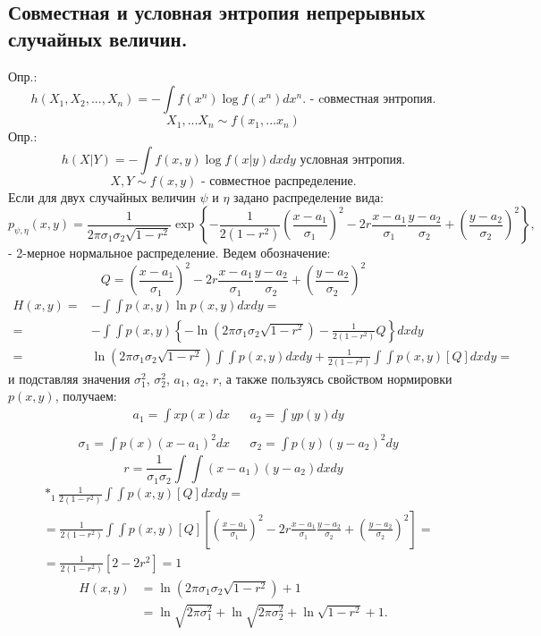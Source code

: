 \documentclass[12pt,a4paper]{scrartcl}
\begin{document}
	\subsection{Совместная и условная энтропия непрерывных случайных величин.}
	Опр.: \\
	\begin{equation}
	h(X_1, X_2,..., X_n) = -\int f(x^n) \log f(x^n) dx^n. \text{ - cовместная энтропия.}
	\end{equation}
	\[
	X_1,...X_n \sim f(x_1,...x_n)
	\]
	Опр.:\\
	\begin{equation}
	h(X|Y) = - \int f(x, y) \log f(x| y) dx dy \text{ условная энтропия.}
	\end{equation}
	\[
	X, Y \sim f (x, y) \text{ - совместное распределение.}
	\]
	Если для двух случайных величин $\psi$ и $\eta$ задано распределение вида:\\
	\[
	p_{\psi,\eta}(x, y) = \frac{1}{2\pi\sigma_1\sigma_2\sqrt{1-r^2}}\exp \left\{-\frac{1}{2(1-r^2)} \left(\frac{x - a_1}{\sigma_1}\right)^2 - 2r\frac{x-a_1}{\sigma_1}\frac{y - a_2}{\sigma_2} + \left(\frac{y - a_2}{\sigma_2}\right)^2 \right\},
	\]
	- 2-мерное нормальное распределение. Ведем обозначение:
	\[
	Q = \left(\frac{x - a_1}{\sigma_1}\right)^2 - 2r\frac{x-a_1}{\sigma_1}\frac{y - a_2}{\sigma_2} + \left(\frac{y - a_2}{\sigma_2}\right)^2
	\]
	\[
	\begin{aligned}
	H(x, y) = & - \int\int p(x, y) \ln p(x, y) dx dy = \\
	= & - \int\int p(x, y) \left\{ -\ln \left( 2 \pi \sigma_1 \sigma_2 \sqrt{1-r^2} \right) - \frac{1}{2(1-r^2)}Q \right\} dx dy\\
	= & \ln \left( 2 \pi \sigma_1 \sigma_2 \sqrt{1-r^2} \right) \int\int p(x, y) dx dy + \frac{1}{2(1-r^2)} \int\int p(x, y) [Q] dx dy =
	\end{aligned}
	\]
	и подставляя значения $\sigma_1^2$, $\sigma_2^2$, $a_1$, $a_2$, $r$, а также пользуясь свойством нормировки $p(x, y)$, получаем:\\
	\[
	\begin{aligned}
	& a_1 = \int x p(x) dx & & a_2 = \int y p(y) dy \\
	\end{aligned}
	\]
	\[
	\begin{aligned}
	& \sigma_1 = \int p(x) (x - a_1)^2 dx & & \sigma_2 = \int p(y) (y -a_2)^2 dy
	\end{aligned}
	\]
	\[
	 r = \frac{1}{\sigma_1\sigma_2} \int \int (x - a_1)(y - a_2) dxdy
	\]
	\[
	\begin{aligned}
	&*_1 \frac{1}{2(1-r^2)}  \int\int p(x, y) [Q] dx dy = \\
	& = \frac{1}{2(1-r^2)} \int\int p(x, y) [Q] \left[ \left(\frac{x - a_1}{\sigma_1}\right)^2 - 2r\frac{x-a_1}{\sigma_1}\frac{y - a_2}{\sigma_2} + \left(\frac{y - a_2}{\sigma_2}\right)^2 \right] =\\
	& = \frac{1}{2(1-r^2)} \left[ 2 - 2r^2 \right] = 1
	\end{aligned}
	\]
	\[
	\begin{aligned}
	H(x, y) & = \ln \left( 2 \pi \sigma_1 \sigma_2 \sqrt{1-r^2} \right) + 1 \\
	& = \ln \sqrt{2\pi\sigma_1^2} + \ln \sqrt{2\pi\sigma_2^2} + \ln\sqrt{1 - r^2} + 1.
	\end{aligned}
	\]
\end{document}
